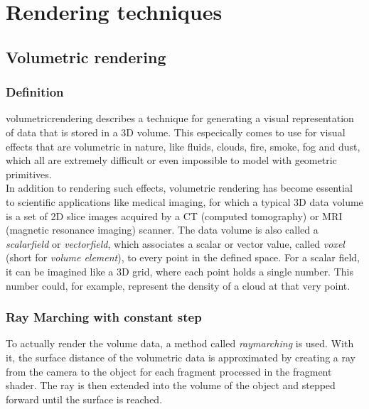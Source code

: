 \section{Rendering techniques}

\subsection{Volumetric rendering}
\label{section:volumetric-rendering}

\subsubsection{Definition}
\Gls{volumetricrendering} describes a technique for generating a visual representation of data that is stored in a 3D volume. 
This especically comes to use for visual effects that are volumetric in nature, like fluids, clouds, fire, smoke, fog and dust, which all are extremely difficult or even impossible to model with geometric primitives.
\\
In addition to rendering such effects, volumetric rendering has become essential to scientific applications like medical imaging, for which a typical 3D data volume is a set of 2D slice images acquired by a CT (computed tomography) or MRI (magnetic resonance imaging) scanner.
\emptyline
The data volume is also called a \textit{\gls{scalarfield}} or \textit{\gls{vectorfield}}, which associates a scalar or vector value, called \textit{\gls{voxel}} (short for \textit{volume element}), to every point in the defined space.
For a scalar field, it can be imagined like a 3D grid, where each point holds a single number. This number could, for example, represent the density of a cloud at that very point.

\subsubsection{Ray Marching with constant step}
To actually render the volume data, a method called \textit{\gls{raymarching}} is used. With it, the surface distance of the volumetric data is approximated by creating a ray from the camera to the object for each fragment processed in the fragment shader. The ray is then extended into the volume of the object and stepped forward until the surface is reached.

